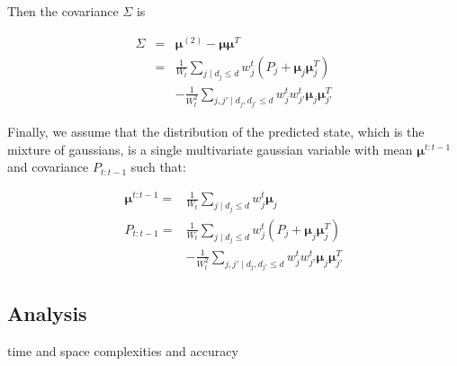 \noindent Then the covariance $\Sigma$ is

\begin{equation}
\begin{array}{lll}
\Sigma & = & \boldsymbol\mu^{(2)} - \boldsymbol\mu \boldsymbol\mu^{T}\\
 & = & \frac{1}{W_{t}}\sum_{j\mid d_{j}\leq d}{w_{j}^{t}\left(P_{j} + \boldsymbol\mu_{j} \boldsymbol\mu^{T}_{j}\right)}\\
 & & - \frac{1}{W^{2}_{t}}\sum_{j,j'\mid d_{j},d_{j'}\leq d}{w_{j}^{t}w_{j'}^{t}\boldsymbol\mu_{j} \boldsymbol\mu^{T}_{j'}}
\end{array}
\label{eq:mixture5}
\end{equation}

Finally, we assume that the distribution of the predicted state, which is the mixture of gaussians, is a single multivariate gaussian variable with mean $\boldsymbol \mu^{t:t-1}$ and covariance $P_{t:t-1}$ such that:

\begin{equation}
\begin{array}{ll}
\boldsymbol \mu^{t:t-1} = & \frac{1}{W_{t}}\sum_{j\mid d_{j}\leq d}{w_{j}^{t}\boldsymbol\mu_{j}}\\
P_{t:t-1} = & \frac{1}{W_{t}}\sum_{j\mid d_{j}\leq d}{w_{j}^{t}\left(P_{j} + \boldsymbol\mu_{j} \boldsymbol\mu^{T}_{j}\right)} \\
 & - \frac{1}{W^{2}_{t}}\sum_{j,j'\mid d_{j},d_{j'}\leq d}{w_{j}^{t}w_{j'}^{t}\boldsymbol\mu_{j} \boldsymbol\mu^{T}_{j'}}
\end{array}
\label{eq:mixture6}
\end{equation}


\subsection{Analysis}

time and space complexities and accuracy